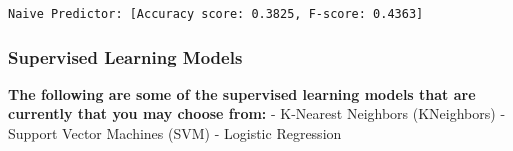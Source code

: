 \documentclass[11pt]{article}
\begin{document}
    \begin{Verbatim}[commandchars=\\\{\}]
Naive Predictor: [Accuracy score: 0.3825, F-score: 0.4363]

    \end{Verbatim}

    \hypertarget{supervised-learning-models}{%
\subsubsection{Supervised Learning
Models}\label{supervised-learning-models}}

\textbf{The following are some of the supervised learning models that
are currently that you may choose from:} - K-Nearest Neighbors
(KNeighbors) - Support Vector Machines (SVM) - Logistic Regression
\end{document}
